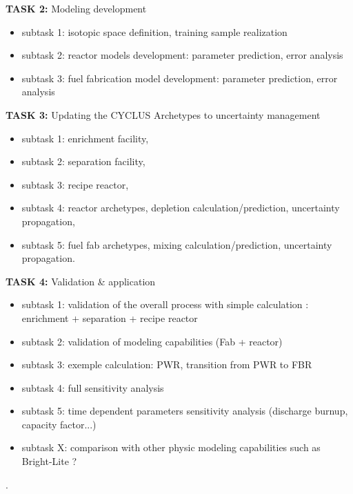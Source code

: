 \documentclass[dvips,12pt]{article}
\begin{document}
\noindent\textbf{TASK 2:} Modeling development
\begin{itemize}
\item subtask 1: isotopic space definition, training sample realization
\item subtask 2: reactor models development: parameter prediction, error analysis
\item subtask 3: fuel fabrication model development: parameter prediction, error analysis 
\end{itemize}


\noindent\textbf{TASK 3:} Updating the CYCLUS Archetypes to uncertainty management
\begin{itemize}
\item subtask 1: enrichment facility, 
\item subtask 2: separation facility,
\item subtask 3: recipe reactor,
\item subtask 4: reactor archetypes, depletion calculation/prediction, uncertainty propagation,
\item subtask 5: fuel fab archetypes, mixing calculation/prediction, uncertainty propagation.
\end{itemize}
 
\noindent\textbf{TASK 4:} Validation \& application
\begin{itemize}
\item subtask 1: validation of the overall process with simple calculation : enrichment + separation + recipe reactor
\item subtask 2: validation of modeling capabilities (Fab + reactor)

\item subtask 3: exemple calculation: PWR, transition from PWR to FBR
\item subtask 4: full sensitivity analysis

\item subtask 5: time dependent parameters sensitivity analysis (discharge burnup, capacity factor...)

\item subtask X: comparison with other physic modeling capabilities such as Bright-Lite ?
\end{itemize}


\pagebreak
.
\pagebreak




 












\end{document}
